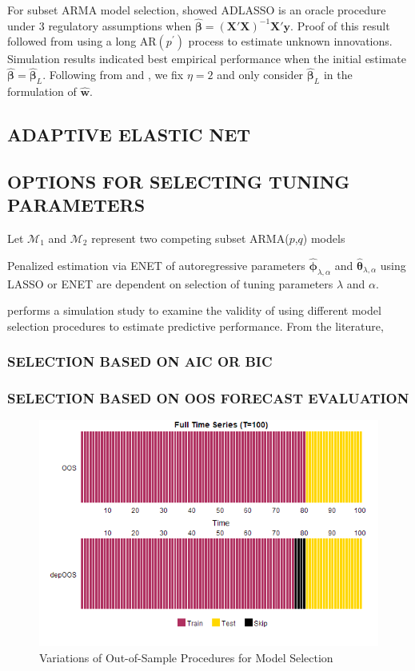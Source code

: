 For subset ARMA model selection, \cite{Chen2011} showed ADLASSO is an oracle procedure under 3 regulatory assumptions when $\hat{\bm{\beta}}=(\bm{X}'\bm{X})^{-1}\bm{X}'\bm{y}$. Proof of this result followed from using a long AR$(p^\prime)$ process to estimate unknown innovations. Simulation results indicated best empirical performance when the initial estimate $\hat{\bm{\beta}}=\hat{\bm{\beta}}_L$. Following from \cite{Zou2006} and \cite{Chen2011}, we fix $\eta=2$ and only consider $\hat{\bm{\beta}}_L$ in the formulation of $\hat{\bm{w}}$.

\subsection{ADAPTIVE ELASTIC NET}


\subsection{OPTIONS FOR SELECTING TUNING PARAMETERS}
Let $\mathcal{M}_1$ and $\mathcal{M}_2$ represent two competing subset ARMA($p$,$q$) models

Penalized estimation via ENET of autoregressive parameters $\hat{\bm{\phi}}_{\lambda,\alpha}$ and $\hat{\bm{\theta}}_{\lambda,\alpha}$ using LASSO or ENET are dependent on selection of tuning parameters $\lambda$ and  $\alpha$.

\cite{Bergmeir2018} performs a simulation study to examine the validity of using different model selection procedures to estimate predictive performance. From the literature, 

\subsubsection{SELECTION BASED ON AIC OR BIC}

\subsubsection{SELECTION BASED ON OOS FORECAST EVALUATION}

\begin{figure}[htbp!]
	\caption{Variations of Out-of-Sample Procedures for Model Selection}
	\label{fig:oosplots}
	\includegraphics[scale=0.7]{oosplots}
\end{figure}

